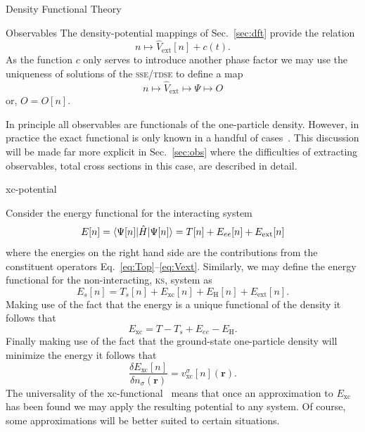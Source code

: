\documentclass[letterpaper, 11 pt]{report}
\begin{document}
\begin{chapter}{Density Functional Theory \label{chap:dft}}
\begin{section}{Observables \label{sec:obs}}
      The density-potential mappings of Sec.~\ref{sec:dft} provide the relation
      \begin{equation} \label{eq:denpot}
         n \mapsto \hat{V}_\mathrm{ext}[n] + c(t).
      \end{equation}
      As the function $c$ only serves to introduce another phase factor we may use the uniqueness of
      solutions of the \textsc{sse}/\textsc{tdse} to define a map
      \begin{equation} \label{eq:obsfunc2}
         n \mapsto \hat{V}_\mathrm{ext} \mapsto \Psi \mapsto O
      \end{equation}
      or, $O = O[n]$.

      In principle all observables are functionals of the one-particle density. However, in practice the
      exact functional is only known in a handful of cases~\cite[p.~211-213]{obs_exac}. This discussion
      will be made far more explicit in Sec.~\ref{sec:obs} where the difficulties of extracting
      observables, total cross sections in this case, are described in detail.

   \end{section}

   \begin{section}{xc-potential \label{sec:xcpot}}

      Consider the energy functional for the interacting system
      \begin{equation} \label{eq:efunc}
         E[n] = \braket{\Psi[n] | \hat{H} | \Psi[n] }= T[n] + E_{ee}[n] + E_\mathrm{ext}[n]
      \end{equation}
      where the energies on the right hand side are the contributions from the constituent operators
      Eq.~\eqref{eq:Top}--\eqref{eq:Vext}. Similarly, we may define the energy functional for the
      non-interacting, \textsc{ks}, system as
      \begin{equation} \label{eq:esfunc}
         E_s[n] =  T_s[n] + E_\mathrm{xc}[n] + E_\mathrm{H}[n] + E_\mathrm{ext}[n].
      \end{equation}
      Making use of the fact that the energy is a unique functional of the density it follows that
      \begin{equation} \label{eq:exc}
         E_\mathrm{xc} = T - T_s + E_{ee} - E_\mathrm{H}.
      \end{equation}
      Finally making use of the fact that the ground-state one-particle density will minimize the energy
      it follows that
      \begin{equation} \label{eq:vxc-der}
         \frac{\delta E_\mathrm{xc}[n]}{\delta n_\sigma(\mathbf{r})}
            = v^\sigma_\mathrm{xc}[n](\mathbf{r}).
      \end{equation}
      The universality of the xc-functional~\cite{dft-engel} means that once an approximation to
      $E_\mathrm{xc}$ has been found we may apply the resulting potential to any system. Of course,
      some approximations will be better suited to certain situations.


\end{section}
\end{chapter}
\end{document}

